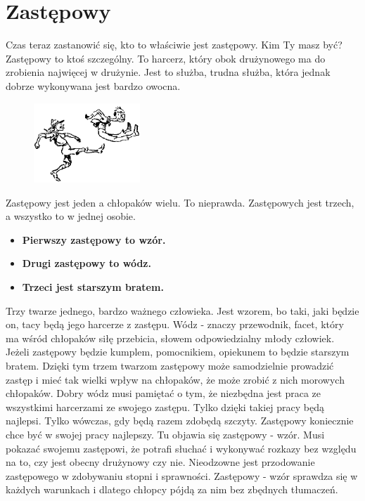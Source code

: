 \section{Zastępowy}
Czas teraz zastanowić się, kto to właściwie jest zastępowy. Kim Ty masz być? Zastępowy to ktoś szczególny. To harcerz, który obok drużynowego ma do zrobienia najwięcej w drużynie. Jest to służba, trudna służba, która jednak dobrze wykonywana jest bardzo owocna. \begin{figure}
  \begin{center}
    \includegraphics[width=4cm]{grafiki/kop.png}
  \end{center}
\end{figure} 
	Zastępowy jest jeden a chłopaków wielu. To nieprawda. Zastępowych jest trzech, a wszystko to w jednej osobie.
\begin{itemize}
\item \textbf{Pierwszy zastępowy  to  wzór.}
\item \textbf{Drugi zastępowy to wódz.}
\item \textbf{Trzeci jest  starszym bratem.}
\end{itemize}


Trzy twarze jednego, bardzo ważnego człowieka. Jest wzorem, bo taki, jaki będzie on, tacy będą jego harcerze z zastępu. Wódz - znaczy przewodnik, facet, który ma wśród chłopaków siłę przebicia, słowem odpowiedzialny młody człowiek. Jeżeli zastępowy będzie kumplem, pomocnikiem, opiekunem to będzie starszym bratem. Dzięki tym trzem twarzom zastępowy może samodzielnie prowadzić zastęp i mieć tak wielki wpływ na chłopaków, że może zrobić z nich morowych chłopaków.
	Dobry  wódz musi pamiętać o tym, że niezbędna jest praca ze wszystkimi  harcerzami  ze  swojego  zastępu. Tylko dzięki takiej pracy będą najlepsi.  Tylko wówczas, gdy będą razem zdobędą szczyty.
	Zastępowy koniecznie chce być w swojej pracy najlepszy. Tu objawia się zastępowy - wzór. Musi pokazać swojemu zastępowi, że potrafi  słuchać i wykonywać rozkazy bez względu na to, czy jest obecny  drużynowy czy nie. Nieodzowne jest przodowanie zastępowego w zdobywaniu stopni i sprawności. Zastępowy - wzór sprawdza się w każdych warunkach i dlatego chłopcy pójdą za nim bez zbędnych tłumaczeń.

